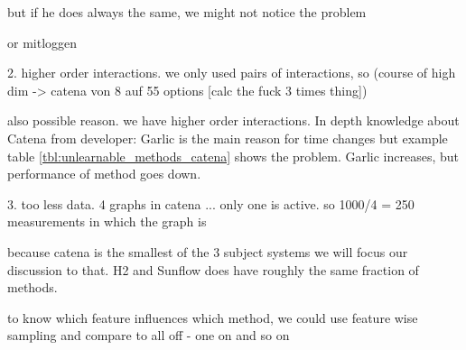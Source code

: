 but if he does always the same, we might not notice the problem

or mitloggen

2. higher order interactions. 
we only used pairs of interactions, so (course of high dim -> catena von 8 auf 55 options [calc the fuck 3 times thing])

also possible reason. we have higher order interactions. In depth knowledge about Catena from developer: Garlic is the main reason for time changes but example table \ref{tbl:unlearnable_methods_catena} shows the problem. Garlic increases, but performance of method goes down.

3. too less data. 4 graphs in catena ... only one is active. so 1000/4 = 250 measurements in which the graph is 

because catena is the smallest of the 3 subject systems we will focus our discussion to that. H2 and Sunflow does have roughly the same fraction of methods. 



to know which feature influences which method, we could use feature wise sampling and compare to all off - one on and so on